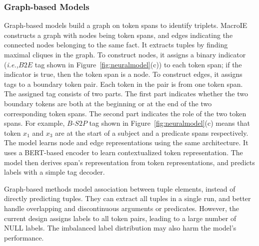 \documentclass{article}
\newcommand{\ie}{\emph{i.e.,}\xspace}
\begin{document}
\subsubsection{Graph-based Models}
Graph-based models build a graph on token spans to identify triplets. MacroIE \cite{yu2021maximal} constructs a graph with nodes being token spans, and edges indicating the connected nodes belonging to the same fact. It extracts tuples by finding maximal cliques in the graph. To construct nodes, it assigns a binary indicator (\ie $B2E$ tag shown in Figure~\ref{fig:neuralmodel}(c)) to each token span; if the indicator is true, then the token span is a node. To construct edges, it assigns tags to a boundary token pair. Each token in the pair is from one token span. The assigned tag consists of two parts. The first part indicates whether the two boundary tokens are both at the beginning or at the end of the two corresponding token spans. The second part indicates the role of the two token spans. For example, $B\text{-}S2P$ tag shown in Figure~\ref{fig:neuralmodel}(c) means that token $x_1$ and $x_3$ are at the start of a subject and a predicate spans respectively.  The model learns  node and edge representations using the same architecture. It uses a BERT-based encoder to learn contextualized token representation. The model then derives span's representation from token representations, and predicts labels with a simple tag decoder.

Graph-based methods model association between tuple elements, instead of directly predicting tuples. They can extract all tuples in a single run, and better handle overlapping and discontinuous arguments or predicates. However, the current design assigns labels to all token pairs, leading to a large number of NULL labels. The imbalanced label distribution may also harm the model's performance.
\end{document}
